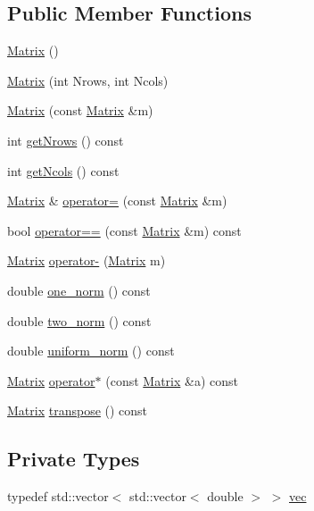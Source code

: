\subsection*{Public Member Functions}
\begin{DoxyCompactItemize}
\item 
\mbox{\hyperlink{class_matrix_a2dba13c45127354c9f75ef576f49269b}{Matrix}} ()
\item 
\mbox{\hyperlink{class_matrix_a135a15de1126d735bb95fcc839d739d7}{Matrix}} (int Nrows, int Ncols)
\item 
\mbox{\hyperlink{class_matrix_a765f4dcb51b6829311cc3e7576388423}{Matrix}} (const \mbox{\hyperlink{class_matrix}{Matrix}} \&m)
\item 
int \mbox{\hyperlink{class_matrix_a711f84a1c62832d9d197d78c9855a276}{get\+Nrows}} () const
\item 
int \mbox{\hyperlink{class_matrix_ae0a5f2154953b8d129a90b04f91d9079}{get\+Ncols}} () const
\item 
\mbox{\hyperlink{class_matrix}{Matrix}} \& \mbox{\hyperlink{class_matrix_aea5a06385f646eb4a63929fae6fa3e14}{operator=}} (const \mbox{\hyperlink{class_matrix}{Matrix}} \&m)
\item 
bool \mbox{\hyperlink{class_matrix_a35097c20bcb1495b57d452db0d7b1f53}{operator==}} (const \mbox{\hyperlink{class_matrix}{Matrix}} \&m) const
\item 
\mbox{\hyperlink{class_matrix}{Matrix}} \mbox{\hyperlink{class_matrix_a2aabf841a4302d528f8b102c0800a263}{operator-\/}} (\mbox{\hyperlink{class_matrix}{Matrix}} m)
\item 
double \mbox{\hyperlink{class_matrix_af4d468252f3ecbbcaa5726c76e332b4c}{one\+\_\+norm}} () const
\item 
double \mbox{\hyperlink{class_matrix_aac496af05ec7aa26afc2b9c6d0ab8b66}{two\+\_\+norm}} () const
\item 
double \mbox{\hyperlink{class_matrix_a43066c7fe6418aad40170b85415063e8}{uniform\+\_\+norm}} () const
\item 
\mbox{\hyperlink{class_matrix}{Matrix}} \mbox{\hyperlink{class_matrix_aaa40c78e6b3bb5bbf572d35612dbf6a7}{operator$\ast$}} (const \mbox{\hyperlink{class_matrix}{Matrix}} \&a) const
\item 
\mbox{\hyperlink{class_matrix}{Matrix}} \mbox{\hyperlink{class_matrix_a759661b75b9681f3a89ff75e27933b3a}{transpose}} () const
\end{DoxyCompactItemize}
\subsection*{Private Types}
\begin{DoxyCompactItemize}
\item 
typedef std\+::vector$<$ std\+::vector$<$ double $>$ $>$ \mbox{\hyperlink{class_matrix_a0027109b5516f852be28259267c6c637}{vec}}
\end{DoxyCompactItemize}
